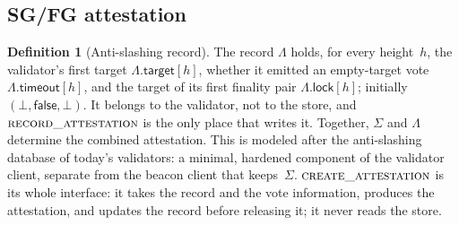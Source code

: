 \documentclass{article}
\theoremstyle{plain}
\theoremstyle{definition}
\newtheorem{definition}{Definition}
\theoremstyle{remark}
\newcommand{\slot}{\operatorname{slot}}
\newcommand{\round}{\mathsf{round}}
\newcommand{\hmax}{h_{\max}}
\newcommand{\fname}[1]{\text{\textsc{#1}}}
\begin{document}
{
}

\subsection{SG/FG attestation}

\begin{definition}[Anti-slashing record]\label{def:antislashing}
The record $\Lambda$ holds, for every height~$h$, the validator's first
target $\Lambda.\mathsf{target}[h]$, whether it emitted an empty-target
vote $\Lambda.\mathsf{timeout}[h]$, and the target of its first finality
pair $\Lambda.\mathsf{lock}[h]$; initially
$(\bot,\mathsf{false},\bot)$.  It belongs to the validator, not to the store,
and $\Call{record\_attestation}{}$ is the only place that writes it.  Together,
$\Sigma$ and $\Lambda$ determine the combined attestation.  This is modeled
after the anti-slashing database of today's validators: a minimal, hardened
component of the validator client, separate from the beacon client that
keeps~$\Sigma$.  $\Call{create\_attestation}{}$ is its whole interface:
it takes the record and the vote information, produces the attestation,
and updates the record before releasing it; it never reads the store.
\end{definition}
\end{document}
